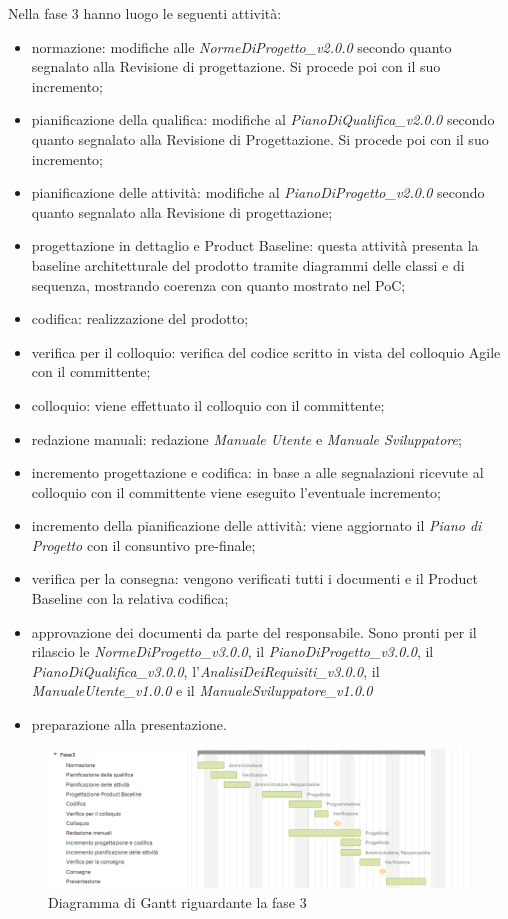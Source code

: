 Nella fase 3 hanno luogo le seguenti attività:
\begin{itemize}
	\item normazione: modifiche alle \textit{NormeDiProgetto\_v2.0.0} secondo quanto segnalato alla Revisione di progettazione. Si procede poi con il suo incremento;
	\item pianificazione della qualifica: modifiche al \textit{PianoDiQualifica\_v2.0.0} secondo quanto segnalato alla Revisione di Progettazione. Si procede poi con il suo incremento;
	\item pianificazione delle attività: modifiche al \textit{PianoDiProgetto\_v2.0.0} secondo quanto segnalato alla Revisione di progettazione;
	\item progettazione in dettaglio e Product Baseline: questa attività presenta la baseline architetturale del prodotto tramite diagrammi delle classi e di sequenza, mostrando coerenza con quanto mostrato nel PoC;
	\item codifica: realizzazione del prodotto;
	\item verifica per il colloquio: verifica del codice scritto in vista del colloquio Agile con il committente;
	\item colloquio: viene effettuato il colloquio con il committente;
	\item redazione manuali: redazione \textit{Manuale Utente} e \textit{Manuale Sviluppatore};
	\item incremento progettazione e codifica: in base a alle segnalazioni ricevute al colloquio con il committente viene eseguito l'eventuale incremento;
	\item incremento della pianificazione delle attività: viene aggiornato il \textit{Piano di Progetto} con il consuntivo pre-finale;
	\item verifica per la consegna: vengono verificati tutti i documenti e il Product Baseline con la relativa codifica;
	\item approvazione dei documenti da parte del responsabile. Sono pronti per il rilascio le \textit{NormeDiProgetto\_v3.0.0}, il \textit{PianoDiProgetto\_v3.0.0}, il \textit{PianoDiQualifica\_v3.0.0}, l'\textit{AnalisiDeiRequisiti\_v3.0.0}, il
	\textit{ManualeUtente\_v1.0.0} e il \textit{ManualeSviluppatore\_v1.0.0}
	\item preparazione alla presentazione.
\end{itemize}

\begin{figure}[h]
	\centering
	\includegraphics[scale=0.70]{images/fase3.png}
	\caption{Diagramma di Gantt riguardante la fase 3}
\end{figure}